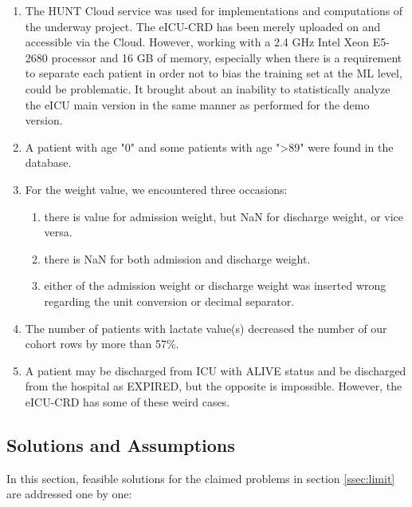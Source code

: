 \begin{enumerate}[label=\alph*)]
    \item The \acrshort{HUNT} Cloud service was used for implementations and computations of the underway project. The \acrshort{eICU-CRD} has been merely uploaded on and accessible via the Cloud. However, working with a 2.4 GHz Intel Xeon\textregistered{} E5-2680 processor and 16 GB of memory, especially when there is a requirement to separate each patient in order not to bias the training set at the \acrlong{ML} level, could be problematic. It brought about an inability to statistically analyze the \acrshort{eICU} main version in the same manner as performed for the demo version.
    \item A patient with age "0" and some patients with age "\textgreater 89" were found in the database.
    \item For the weight value, we encountered three occasions:
    \begin{enumerate}[label=\arabic*)]
        \item there is value for admission weight, but \acrshort{NaN} for discharge weight, or vice versa.
        \item there is \acrshort{NaN} for both admission and discharge weight.
        \item either of the admission weight or discharge weight was inserted wrong regarding the unit conversion or decimal separator.
    \end{enumerate}
    \item The number of patients with lactate value(s) decreased the number of our cohort rows by more than 57\%.
    \item A patient may be discharged from \acrshort{ICU} with ALIVE status and be discharged from the hospital as EXPIRED, but the opposite is impossible. However, the \acrshort{eICU-CRD} has some of these weird cases.
\end{enumerate}

\subsection{Solutions and Assumptions}
In this section, feasible solutions for the claimed problems in section \ref{ssec:limit} are addressed one by one:

